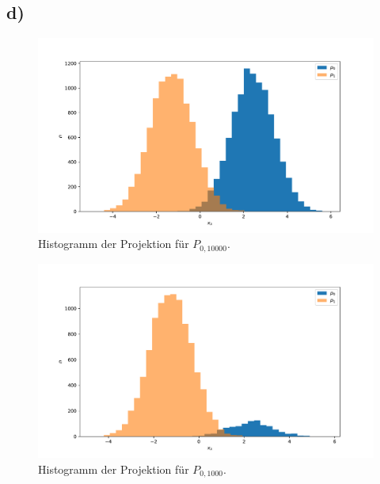 \documentclass[a4paper, 11pt]{article}
\begin{document}
\subsection*{d)}
\begin{figure}
    \centering
    \includegraphics[width=\textwidth]{../A16/A16d_10000.pdf}
    \caption{Histogramm der Projektion für $P_{0, 10000}$.}
    \label{fig:A16d_10000}
\end{figure}
\begin{figure}
    \centering
    \includegraphics[width=\textwidth]{../A16/A16d_1000.pdf}
    \caption{Histogramm der Projektion für $P_{0, 1000}$.}
    \label{fig:A16d_1000}
\end{figure}
\FloatBarrier
\end{document}
